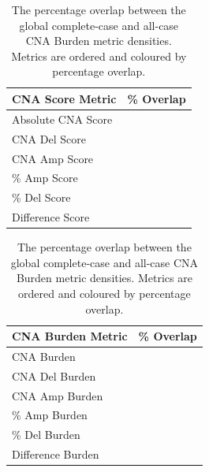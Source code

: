 \begin{table}[h]
    \begin{minipage}{.49\linewidth}
    \caption[The percentage overlap between the global complete-case and all-case CNA Score metric densities.]{
    The percentage overlap between the global complete-case and all-case CNA Score metric densities.
    Metrics are ordered and coloured by percentage overlap.}
      \centering 
\begin{tabular}[t]{l>{}r}
\toprule
CNA Score Metric & \% Overlap\\
\midrule
Absolute CNA Score & \cellcolor[HTML]{414487}{\textcolor{white}{96.55}}\\
 
CNA Del Score & \cellcolor[HTML]{482374}{\textcolor{white}{97.15}}\\
 
CNA Amp Score & \cellcolor[HTML]{481769}{\textcolor{white}{97.35}}\\
 
\% Amp Score & \cellcolor[HTML]{46085B}{\textcolor{white}{97.58}}\\
 
\% Del Score & \cellcolor[HTML]{440154}{\textcolor{white}{97.69}}\\
 
Difference Score & \cellcolor[HTML]{440154}{\textcolor{white}{97.69}}\\
\bottomrule
\end{tabular} \label{table:CNAScoreT1}
    \end{minipage}%
    \hspace{0.4cm}
    \begin{minipage}{.49\linewidth}
      \centering
    \caption[The percentage overlap between the global complete-case and all-case CNA Burden metric densities.]{
    The percentage overlap between the global complete-case and all-case CNA Burden metric densities.
    Metrics are ordered and coloured by percentage overlap.} 
\begin{tabular}[t]{l>{}r}
\toprule
CNA Burden Metric & \% Overlap\\
\midrule
CNA Burden & \cellcolor[HTML]{414487}{\textcolor{white}{96.76}}\\
 
CNA Del Burden & \cellcolor[HTML]{472D7B}{\textcolor{white}{97.18}}\\
 
CNA Amp Burden & \cellcolor[HTML]{482979}{\textcolor{white}{97.24}}\\
 
\% Amp Burden & \cellcolor[HTML]{481C6E}{\textcolor{white}{97.45}}\\
 
\% Del Burden & \cellcolor[HTML]{481C6E}{\textcolor{white}{97.45}}\\
 
Difference Burden & \cellcolor[HTML]{440154}{\textcolor{white}{97.87}}\\
\bottomrule
\end{tabular} \label{table:CNABurdenT1}
    \end{minipage}
\end{table}
\clearpage

